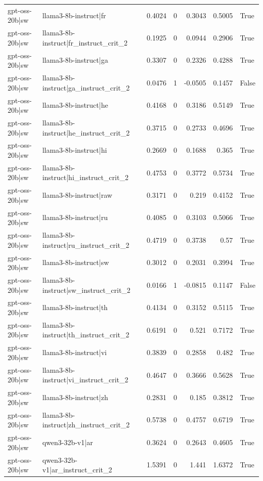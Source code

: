\begin{table}
\begin{tabular}{l l r r r r l}
gpt-oss-20b|sw & llama3-8b-instruct|fr & 0.4024 & 0 & 0.3043 & 0.5005 & True \\
gpt-oss-20b|sw & llama3-8b-instruct|fr_instruct_crit_2 & 0.1925 & 0 & 0.0944 & 0.2906 & True \\
gpt-oss-20b|sw & llama3-8b-instruct|ga & 0.3307 & 0 & 0.2326 & 0.4288 & True \\
gpt-oss-20b|sw & llama3-8b-instruct|ga_instruct_crit_2 & 0.0476 & 1 & -0.0505 & 0.1457 & False \\
gpt-oss-20b|sw & llama3-8b-instruct|he & 0.4168 & 0 & 0.3186 & 0.5149 & True \\
gpt-oss-20b|sw & llama3-8b-instruct|he_instruct_crit_2 & 0.3715 & 0 & 0.2733 & 0.4696 & True \\
gpt-oss-20b|sw & llama3-8b-instruct|hi & 0.2669 & 0 & 0.1688 & 0.365 & True \\
gpt-oss-20b|sw & llama3-8b-instruct|hi_instruct_crit_2 & 0.4753 & 0 & 0.3772 & 0.5734 & True \\
gpt-oss-20b|sw & llama3-8b-instruct|raw & 0.3171 & 0 & 0.219 & 0.4152 & True \\
gpt-oss-20b|sw & llama3-8b-instruct|ru & 0.4085 & 0 & 0.3103 & 0.5066 & True \\
gpt-oss-20b|sw & llama3-8b-instruct|ru_instruct_crit_2 & 0.4719 & 0 & 0.3738 & 0.57 & True \\
gpt-oss-20b|sw & llama3-8b-instruct|sw & 0.3012 & 0 & 0.2031 & 0.3994 & True \\
gpt-oss-20b|sw & llama3-8b-instruct|sw_instruct_crit_2 & 0.0166 & 1 & -0.0815 & 0.1147 & False \\
gpt-oss-20b|sw & llama3-8b-instruct|th & 0.4134 & 0 & 0.3152 & 0.5115 & True \\
gpt-oss-20b|sw & llama3-8b-instruct|th_instruct_crit_2 & 0.6191 & 0 & 0.521 & 0.7172 & True \\
gpt-oss-20b|sw & llama3-8b-instruct|vi & 0.3839 & 0 & 0.2858 & 0.482 & True \\
gpt-oss-20b|sw & llama3-8b-instruct|vi_instruct_crit_2 & 0.4647 & 0 & 0.3666 & 0.5628 & True \\
gpt-oss-20b|sw & llama3-8b-instruct|zh & 0.2831 & 0 & 0.185 & 0.3812 & True \\
gpt-oss-20b|sw & llama3-8b-instruct|zh_instruct_crit_2 & 0.5738 & 0 & 0.4757 & 0.6719 & True \\
gpt-oss-20b|sw & qwen3-32b-v1|ar & 0.3624 & 0 & 0.2643 & 0.4605 & True \\
gpt-oss-20b|sw & qwen3-32b-v1|ar_instruct_crit_2 & 1.5391 & 0 & 1.441 & 1.6372 & True \\

\end{tabular}
\end{table}
